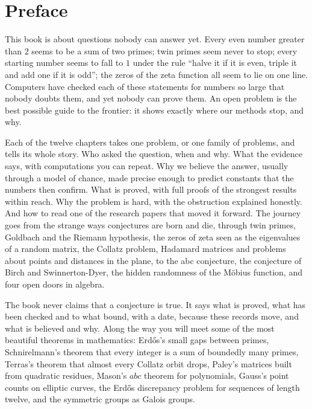 \chapter*{Preface}
This book is about questions nobody can answer yet. Every even number greater than $2$ seems to be a sum of two
primes; twin primes seem never to stop; every starting number seems to fall to $1$ under the rule ``halve it if
it is even, triple it and add one if it is odd''; the zeros of the zeta function all seem to lie on one line.
Computers have checked each of these statements for numbers so large that nobody doubts them, and yet nobody
can prove them. An open problem is the best possible guide to the frontier: it shows exactly where our methods
stop, and why.

Each of the twelve chapters takes one problem, or one family of problems, and tells its whole story. Who asked
the question, when and why. What the evidence says, with computations you can repeat. Why we believe the
answer, usually through a model of chance, made precise enough to predict constants that the numbers then
confirm. What is proved, with full proofs of the strongest results within reach. Why the problem is hard, with
the obstruction explained honestly. And how to read one of the research papers that moved it forward. The
journey goes from the strange ways conjectures are born and die, through twin primes, Goldbach and the Riemann
hypothesis, the zeros of zeta seen as the eigenvalues of a random matrix, the Collatz problem, Hadamard
matrices and problems about points and distances in the plane, to the abc conjecture, the conjecture of Birch
and Swinnerton-Dyer, the hidden randomness of the M\"obius function, and four open doors in algebra.

The book never claims that a conjecture is true. It says what is proved, what has been checked and to what
bound, with a date, because these records move, and what is believed and why. Along the way you will meet
some of the most beautiful theorems in mathematics: Erd\H os's small gaps between primes, Schnirelmann's
theorem that every integer is a sum of boundedly many primes, Terras's theorem that almost every Collatz orbit
drops, Paley's matrices built from quadratic residues, Mason's $abc$ theorem for polynomials, Gauss's point
counts on elliptic curves, the Erd\H os discrepancy problem for sequences of length twelve, and the symmetric
groups as Galois groups.

